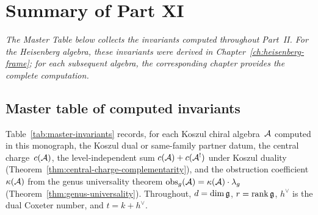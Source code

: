 \chapter*{Summary of Part XI}


\noindent\emph{The Master Table below collects the invariants computed throughout Part~II.  For the Heisenberg algebra, these invariants were derived in Chapter~\ref{ch:heisenberg-frame}; for each subsequent algebra, the corresponding chapter provides the complete computation.}

\section*{Master table of computed invariants}
\label{sec:master-table}

Table~\ref{tab:master-invariants} records, for each Koszul chiral
algebra~$\mathcal{A}$ computed in this monograph, the Koszul dual or
same-family partner datum, the central charge~$c(\mathcal{A})$, the
level-independent sum $c(\mathcal{A}) + c(\mathcal{A}^!)$ under Koszul duality
(Theorem~\ref{thm:central-charge-complementarity}), and the
obstruction coefficient $\kappa(\mathcal{A})$ from the genus universality
theorem $\operatorname{obs}_g(\mathcal{A}) = \kappa(\mathcal{A}) \cdot \lambda_g$
(Theorem~\ref{thm:genus-universality}).
Throughout, $d = \dim\mathfrak{g}$, $r = \operatorname{rank}\mathfrak{g}$,
$h^\vee$ is the dual Coxeter number, and $t = k + h^\vee$.

